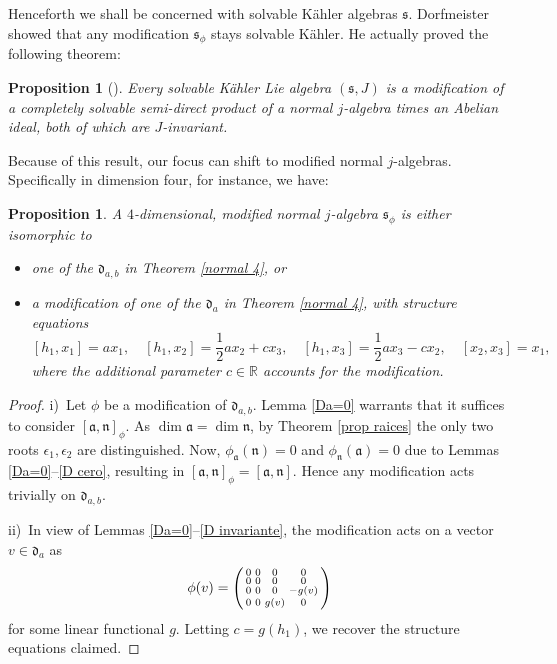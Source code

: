 \documentclass[12pt, twoside]{amsart}
\def\d{\mathfrak{d}}
\def\n{\mathfrak{n}}
\def\a{\mathfrak{a}}
\def\s{\mathfrak s}
\def\R{\mathbb{R}}
\newenvironment{spmatrix}{\left(\smallmatrix}{\endsmallmatrix\right)}
\newtheorem{prop}[definition]{Proposition}
\theoremstyle{definition}
\begin{document}
\vspace{.5cm}

Henceforth we shall be concerned with solvable K{\"a}hler algebras $\s$. Dorfmeister showed that any modification $\s_{\phi}$ stays solvable K{\"a}hler. 
He actually proved the following theorem:
\begin{prop}[\cite{Dorf}]\label{dorf} 
    Every solvable K{\"a}hler Lie algebra $(\s, J)$ is a modification of a completely solvable semi-direct product of a normal $j$-algebra times an Abelian ideal, both of which are $J$-invariant.
\end{prop}

Because of this result, our focus can shift to modified normal $j$-algebras.  Specifically in dimension four, for instance, we have:

\begin{prop} \label{clasi dim 4}
    A $4$-dimensional, modified normal $j$-algebra $\s_{\phi}$ is either isomorphic to
\begin{itemize}
    \item[i)] one of the $\d_{a,b}$ in Theorem \ref{normal 4}, or 
\item[ii)] a modification of 
one of the $\d_{a}$ in Theorem \ref{normal 4}, with structure equations  
$$[h_1,x_1]= a x_1,\quad
    [h_1, x_2]=\frac{1}{2}ax_2+ cx_3,\quad
    [h_1, x_3]=\frac{1}{2}ax_3 - cx_2,\quad
    [x_2, x_3]=x_1,
$$ 
where the additional parameter $c\in\R$ accounts for the modification.
\end{itemize}    
\end{prop}

\begin{proof}
  i)\ Let $\phi$ be a modification of $\d_{a,b}$. Lemma \ref{Da=0} warrants that  
  it suffices to consider  $[\a,\n]_{\phi}$. As 
  $\dim \a= \dim \n$, by Theorem \ref{prop raices} the only two roots $\epsilon_{1}, \epsilon_{2}$ are  distinguished. 
 Now,  $\phi_\a (\n)=0$ and $\phi_\n(\a)=0$ due to Lemmas 
\ref{Da=0}--\ref{D cero}, resulting in  $[\a,\n]_{\phi}=[\a,\n]$.
Hence any modification acts trivially on $\d_{a,b}$. \par
\quad ii)\ In view of Lemmas \ref{Da=0}--\ref{D invariante}, the modification acts on a vector $v \in \d_a$ as 
\begin{equation*}
\phi(v)=
    \begin{spmatrix}
        0 & 0 & 0 & 0\\
        0 & 0 & 0 & 0 \\
        0 & 0 & 0 & -g(v) \\
        0 & 0 & g(v) & 0
    \end{spmatrix}
\end{equation*}
for some linear functional $g$. Letting  $c=g(h_1)$, we recover the structure equations claimed.
\end{proof}
\end{document}
